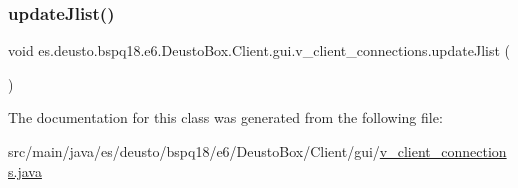 \subsubsection{\texorpdfstring{update\+Jlist()}{updateJlist()}}
{\footnotesize\ttfamily void es.\+deusto.\+bspq18.\+e6.\+Deusto\+Box.\+Client.\+gui.\+v\+\_\+client\+\_\+connections.\+update\+Jlist (\begin{DoxyParamCaption}{ }\end{DoxyParamCaption})}



The documentation for this class was generated from the following file\+:\begin{DoxyCompactItemize}
\item 
src/main/java/es/deusto/bspq18/e6/\+Deusto\+Box/\+Client/gui/\mbox{\hyperlink{v__client__connections_8java}{v\+\_\+client\+\_\+connections.\+java}}\end{DoxyCompactItemize}
